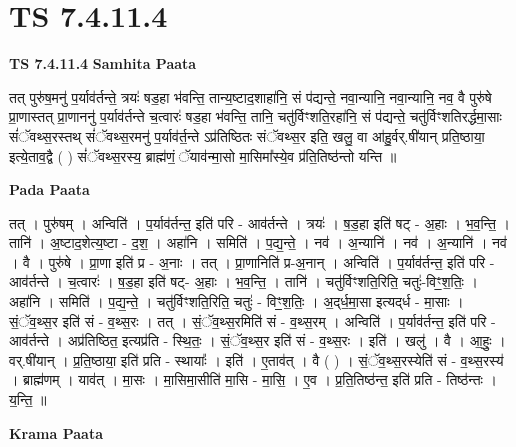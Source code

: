 \documentclass[17pt]{extarticle}
\begin{document}
\section{ TS 7.4.11.4 }

\textbf{TS 7.4.11.4 } \newline
\textbf{Samhita Paata} \newline

तत् पुरु॑ष॒मनु॑ प॒र्याव॑र्तन्ते॒ त्रयः॑ षड॒हा भ॑वन्ति॒ तान्य॒ष्टाद॒शाहा॑नि॒ सं प॑द्यन्ते॒ नवा॒न्यानि॒ नवा॒न्यानि॒ नव॒ वै पुरु॑षे प्रा॒णास्तत् प्रा॒णाननु॑ प॒र्याव॑र्तन्ते च॒त्वारः॑ षड॒हा भ॑वन्ति॒ तानि॒ चतु॑र्विꣳशति॒रहा॑नि॒ सं प॑द्यन्ते॒ चतु॑र्विꣳशतिरर्द्धमा॒साः सं॑ॅवथ्स॒रस्तथ् सं॑ॅवथ्स॒रमनु॑ प॒र्याव॑र्त॒न्ते ऽप्र॑तिष्ठितः संॅवथ्स॒र इति॒ खलु॒ वा आ॑हु॒र्वर्.षी॑यान् प्रति॒ष्ठाया॒ इत्ये॒ताव॒द्वै ( ) सं॑ॅवथ्स॒रस्य॒ ब्राह्म॑णं॒ ॅयाव॑न्मा॒सो मा॒सिमा᳚स्ये॒व प्र॑ति॒तिष्ठ॑न्तो यन्ति ॥ \newline

\textbf{Pada Paata} \newline

तत् । पुरु॑षम् । अन्विति॑ । प॒र्याव॑र्तन्त॒ इति॑ परि - आव॑र्तन्ते । त्रयः॑ । ष॒ड॒हा इति॑ षट् - अ॒हाः । भ॒व॒न्ति॒ । तानि॑ । अ॒ष्टाद॒शेत्य॒ष्टा - द॒श॒ । अहा॑नि । समिति॑ । प॒द्य॒न्ते॒ । नव॑ । अ॒न्यानि॑ । नव॑ । अ॒न्यानि॑ । नव॑ । वै । पुरु॑षे । प्रा॒णा इति॑ प्र - अ॒नाः । तत् । प्रा॒णानिति॑ प्र-अ॒नान् । अन्विति॑ । प॒र्याव॑र्तन्त॒ इति॑ परि - आव॑र्तन्ते । च॒त्वारः॑ । ष॒ड॒हा इति॑ षट्- अ॒हाः । भ॒व॒न्ति॒ । तानि॑ । चतु॑र्विꣳशति॒रिति॒ चतुः॑-विꣳ॒॒श॒तिः॒ । अहा॑नि । समिति॑ । प॒द्य॒न्ते॒ । चतु॑र्विꣳशति॒रिति॒ चतुः॑ - विꣳ॒॒श॒तिः॒ । अ॒द्‌र्ध॒मा॒सा इत्यद्‌र्ध - मा॒साः । सं॒ॅव॒थ्स॒र इति॑ सं - व॒थ्स॒रः । तत् । सं॒ॅव॒थ्स॒रमिति॑ सं - व॒थ्स॒रम् । अन्विति॑ । प॒र्याव॑र्तन्त॒ इति॑ परि - आव॑र्तन्ते । अप्र॑तिष्ठित॒ इत्यप्र॑ति - स्थि॒तः॒ । सं॒ॅव॒थ्स॒र इति॑ सं - व॒थ्स॒रः । इति॑ । खलु॑ । वै । आ॒हुः॒ । वर्.षी॑यान् । प्र॒ति॒ष्ठाया॒ इति॑ प्रति - स्थायाः᳚ । इति॑ । ए॒ताव॑त् । वै ( ) । सं॒ॅव॒थ्स॒रस्येति॑ सं - व॒थ्स॒रस्य॑ । ब्राह्म॑णम् । याव॑त् । मा॒सः । मा॒सिमा॒सीति॑ मा॒सि - मा॒सि॒ । ए॒व । प्र॒ति॒तिष्ठ॑न्त॒ इति॑ प्रति - तिष्ठ॑न्तः । य॒न्ति॒ ॥  \newline


\textbf{Krama Paata} \newline
\end{document}
